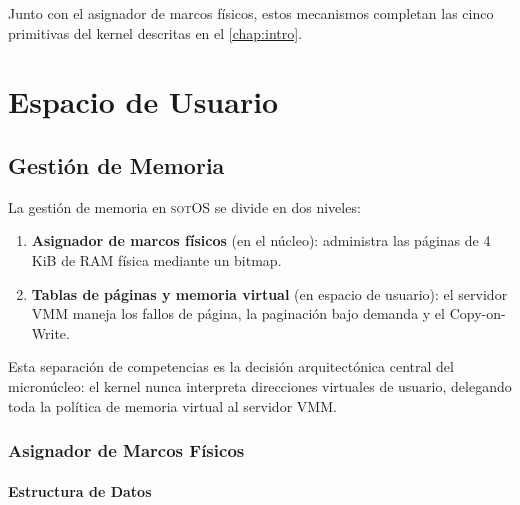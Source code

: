 \documentclass[11pt,twoside,openright]{book}
\theoremstyle{definition}
\theoremstyle{plain}
\theoremstyle{remark}
\newcommand{\sotos}{\textsc{sotOS}}
\begin{document}
Junto con el asignador de marcos físicos, estos mecanismos completan las cinco primitivas
del kernel descritas en el \cref{chap:intro}.

%
%

\part{Espacio de Usuario}

\chapter{Gestión de Memoria}
\label{chap:memoria}

La gestión de memoria en \sotos{} se divide en dos niveles:
\begin{enumerate}
    \item \textbf{Asignador de marcos físicos} (en el núcleo): administra las páginas
          de 4\,KiB de RAM física mediante un bitmap.
    \item \textbf{Tablas de páginas y memoria virtual} (en espacio de usuario): el
          servidor VMM maneja los fallos de página, la paginación bajo demanda y el
          Copy-on-Write.
\end{enumerate}

Esta separación de competencias es la decisión arquitectónica central del micronúcleo:
el kernel nunca interpreta direcciones virtuales de usuario, delegando toda la política
de memoria virtual al servidor VMM.

\section{Asignador de Marcos Físicos}
\label{sec:frame-alloc}

\subsection{Estructura de Datos}
\end{document}
